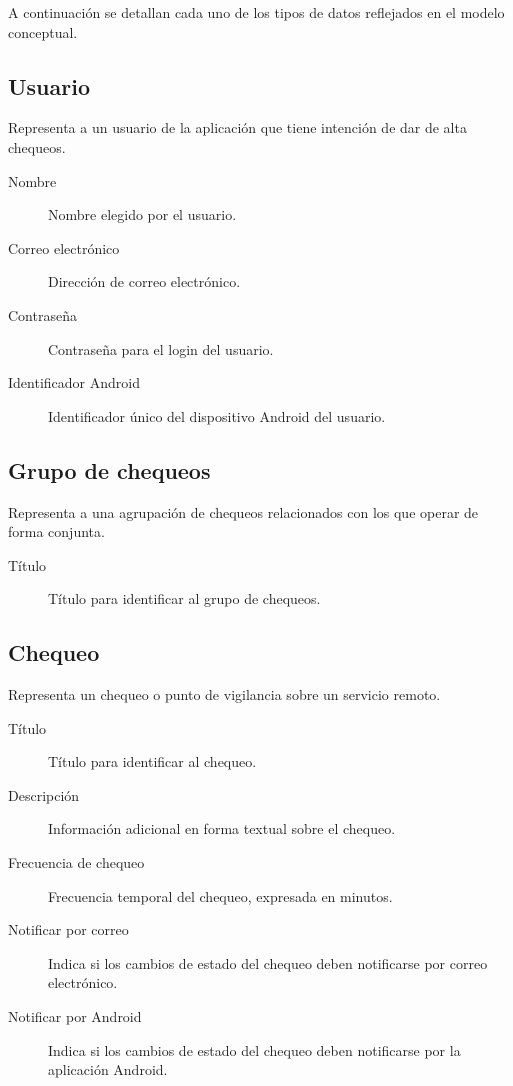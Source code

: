 A continuación se detallan cada uno de los tipos de datos reflejados en el
modelo conceptual.

\subsection{Usuario}

Representa a un usuario de la aplicación que tiene intención de dar de alta
chequeos.

\begin{description}
\item[Nombre] Nombre elegido por el usuario.
\item[Correo electrónico] Dirección de correo electrónico.
\item[Contraseña] Contraseña para el login del usuario.
\item[Identificador Android] Identificador único del dispositivo Android del usuario.
\end{description}

\subsection{Grupo de chequeos}

Representa a una agrupación de chequeos relacionados con los que operar de forma
conjunta.

\begin{description}
\item[Título] Título para identificar al grupo de chequeos.
\end{description}

\subsection{Chequeo}

Representa un chequeo o punto de vigilancia sobre un servicio remoto.

\begin{description}
\item[Título] Título para identificar al chequeo.
\item[Descripción] Información adicional en forma textual sobre el chequeo.
\item[Frecuencia de chequeo] Frecuencia temporal del chequeo, expresada en minutos.
\item[Notificar por correo] Indica si los cambios de estado del chequeo deben notificarse por correo electrónico.
\item[Notificar por Android] Indica si los cambios de estado del chequeo deben notificarse por la aplicación Android.
\end{description}


